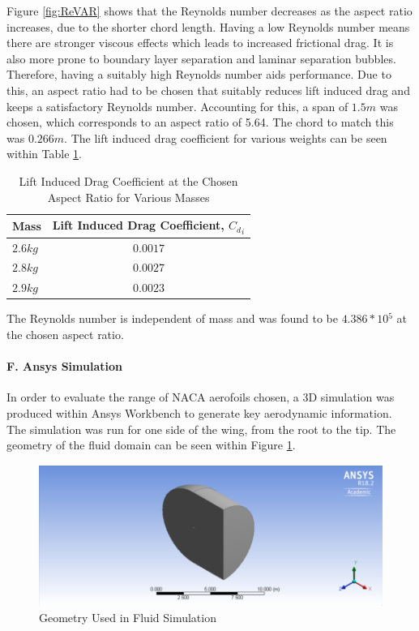 \documentclass[12pt]{article}
\begin{document}
\noindent Figure \ref{fig:ReVAR} shows that the Reynolds number decreases as the aspect ratio increases, due to the shorter chord length. Having a low Reynolds number means there are stronger viscous effects which leads to increased frictional drag. It is also more prone to boundary layer separation and laminar separation bubbles. Therefore, having a suitably high Reynolds number aids performance. Due to this, an aspect ratio had to be chosen that suitably reduces lift induced drag and keeps a satisfactory Reynolds number. Accounting for this, a span of $1.5m$ was chosen, which corresponds to an aspect ratio of 5.64. The chord to match this was $0.266m$. The lift induced drag coefficient for various weights can be seen within Table \ref{table:indrc}. \\

\begin{table}[h]
    \centering
    \begin{tabular}{|l|c|}
        \hline
        \textbf{Mass} & \textbf{Lift Induced Drag Coefficient, $C{{_d}_i}$} \\
        \hline 
        $2.6kg$ & $0.0017$ \\
        \hline 
        $2.8kg$ & $0.0027$ \\
        \hline 
        $2.9kg$ & $0.0023$ \\
        \hline
    \end{tabular}
    \caption{Lift Induced Drag Coefficient at the Chosen Aspect Ratio for Various Masses}
    \label{table:indrc}
\end{table}

\noindent The Reynolds number is independent of mass and was found to be $4.386*10{^5}$ at the chosen aspect ratio. \\

\paragraph{F. Ansys Simulation} In order to evaluate the range of NACA aerofoils chosen, a 3D simulation was produced within Ansys Workbench to generate key aerodynamic information. The simulation was run for one side of the wing, from the root to the tip. The geometry of the fluid domain can be seen within Figure \ref{fig:cfdgeom}. \\

\begin{figure}[H]
\includegraphics[width=18cm, scale=1]{cfdgeometry.png}
\centering
\caption{Geometry Used in Fluid Simulation}
\label{fig:cfdgeom}
\end{figure}
\end{document}
